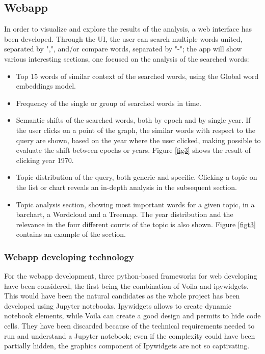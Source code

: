 \subsection{Webapp}
In order to visualize and explore the results of the analysis, a web interface has been developed. Through the UI, the
user can search multiple words united, separated by ",", and/or compare words, separated by "-"; the app will show
various interesting sections, one focused on the analysis of the searched words: 
\begin{itemize}
  \item Top 15 words of similar context of the searched words, using the Global word embeddings model.
  \item Frequency of the single or group of searched words in time.
  \item Semantic shifts of the searched words, both by epoch and by single year.
    If the user clicks on a point of the graph, the similar words with respect to the query 
    are shown, based on the year where the user clicked, making possible to evaluate the  
    shift between epochs or years. Figure \vref{fig3} shows the result of clicking year 1970.
  \item Topic distribution of the query, both generic and specific. Clicking 
  a topic on the list or chart reveals an in-depth analysis in the subsequent section.
  \item Topic analysis section, showing most important words for a given topic, in a barchart, 
  a Wordcloud and a Treemap. The year distribution and the relevance in the four different courts of the topic is also shown. Figure \vref{figt3} contains an example of the section.
\end{itemize}

\subsubsection{Webapp developing technology}
For the webapp development, three python-based frameworks for web developing have been considered, the 
first being the combination of Voila and ipywidgets. This would have been the natural candidates as the whole project has 
been developed using Jupyter notebooks. Ipywidgets allows to create dynamic notebook elements, while 
Voila can create a good design and permits to hide code cells.
They have been discarded because of the technical requirements needed to run and understand a Jupyter
notebook; even if the complexity could have been partially hidden, the graphics component of Ipywidgets 
are not so captivating.

